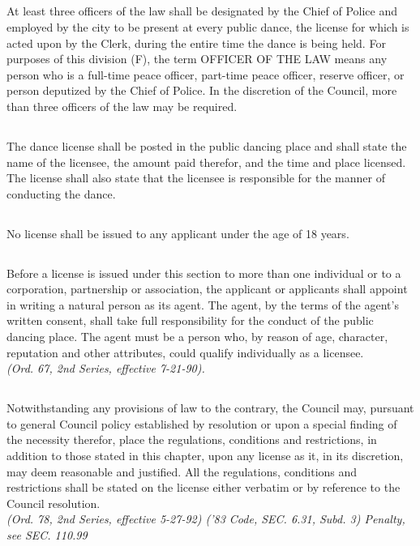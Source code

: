 \subsection{}
At least three officers of the law shall be designated by the Chief of Police and employed by the city to be present at every public dance, the license for which is acted upon by the Clerk, during the entire time the dance is being held.  For purposes of this division (F), the term OFFICER OF THE LAW means any person who is a full-time peace officer, part-time peace officer, reserve officer, or person deputized by the Chief of Police.  In the discretion of the Council, more than three officers of the law may be required.
\subsection{}
The dance license shall be posted in the public dancing place and shall state the name of the licensee, the amount paid therefor, and the time and place licensed.  The license shall also state that the licensee is responsible for the manner of conducting the dance.
\subsection{}
No license shall be issued to any applicant under the age of 18 years.
\subsection{}
Before a license is issued under this section to more than one individual or to a corporation, partnership or association, the applicant or applicants shall appoint in writing a natural person as its agent.  The agent, by the terms of the agent’s written consent, shall take full responsibility for the conduct of the public dancing place.  The agent must be a person who, by reason of age, character, reputation and other attributes, could qualify individually as a licensee.\\
\emph{(Ord. 67, 2nd Series, effective 7-21-90).}
\subsection{}
Notwithstanding any provisions of law to the contrary, the Council may, pursuant to general Council policy established by resolution or upon a special finding of the necessity therefor, place the regulations, conditions and restrictions, in addition to those stated in this chapter, upon any license as it, in its discretion, may deem reasonable and justified.  All the regulations, conditions and restrictions shall be stated on the license either verbatim or by reference to the Council resolution.\\
\emph{(Ord. 78, 2nd Series, effective 5-27-92) (’83 Code, SEC. 6.31, Subd. 3)  Penalty, see SEC. 110.99}

